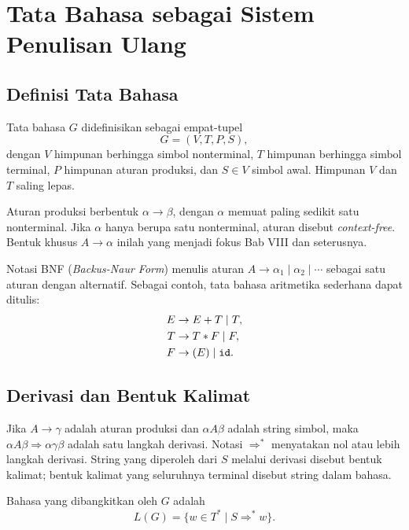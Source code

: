 \section{Tata Bahasa sebagai Sistem Penulisan Ulang}
\label{sec:ch02-grammar}

\subsection{Definisi Tata Bahasa}

\begin{definisi}
Tata bahasa \(G\) didefinisikan sebagai empat-tupel
\[
G = (V, T, P, S),
\]
dengan \(V\) himpunan berhingga simbol nonterminal, \(T\) himpunan
berhingga simbol terminal, \(P\) himpunan aturan produksi, dan
\(S \in V\) simbol awal. Himpunan \(V\) dan \(T\) saling lepas.
\end{definisi}

Aturan produksi berbentuk \(\alpha \to \beta\), dengan \(\alpha\)
memuat paling sedikit satu nonterminal. Jika \(\alpha\) hanya berupa
satu nonterminal, aturan disebut \emph{context-free}. Bentuk khusus
\(A \to \alpha\) inilah yang menjadi fokus Bab VIII dan seterusnya.

Notasi BNF (\emph{Backus-Naur Form}) menulis aturan
\(A \to \alpha_1 \mid \alpha_2 \mid \cdots\) sebagai satu aturan
dengan alternatif. Sebagai contoh, tata bahasa aritmetika sederhana
dapat ditulis:
\[
\begin{aligned}
E &\to E + T \mid T,\\
T &\to T * F \mid F,\\
F &\to (E) \mid \texttt{id}.
\end{aligned}
\]

\subsection{Derivasi dan Bentuk Kalimat}

\begin{definisi}[Derivasi]
Jika \(A \to \gamma\) adalah aturan produksi dan
\(\alpha A \beta\) adalah string simbol, maka
\(\alpha A \beta \Rightarrow \alpha \gamma \beta\) adalah satu
langkah derivasi. Notasi \(\Rightarrow^{*}\) menyatakan nol atau lebih
langkah derivasi. String yang diperoleh dari \(S\) melalui derivasi
disebut bentuk kalimat; bentuk kalimat yang seluruhnya terminal
disebut string dalam bahasa.
\end{definisi}

Bahasa yang dibangkitkan oleh \(G\) adalah
\[
L(G) = \{w \in T^{*} \mid S \Rightarrow^{*} w\}.
\]

